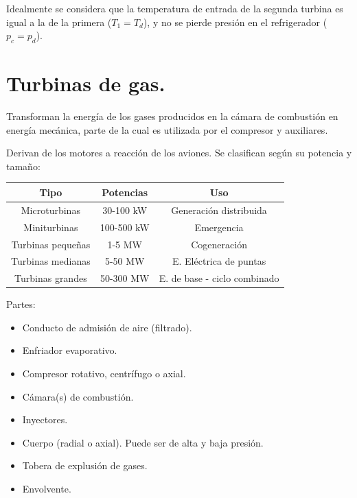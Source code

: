			
			Idealmente se considera que la temperatura de entrada de la segunda turbina es igual a la de la primera ($T_1 = T_d$), y no se pierde presión en el refrigerador ($p_c = p_d$).
			
	
	\section{Turbinas de gas.}
		Transforman la energía de los gases producidos en la cámara de combustión en energía mecánica, parte de la cual es utilizada por el compresor y auxiliares.
		
		
		Derivan de los motores a reacción de los aviones. Se clasifican según su potencia y tamaño:
		\begin{table}[H]
			\centering
			\begin{tabular}{ccc}
				Tipo & Potencias & Uso\\
				\hline
				Microturbinas		& 30-100 kW & Generación distribuida \\
				Miniturbinas		& 100-500 kW& Emergencia\\
				Turbinas pequeñas	& 1-5 MW	& Cogeneración\\
				Turbinas medianas	& 5-50 MW	& E. Eléctrica de puntas\\
				Turbinas grandes	& 50-300 MW	& E. de base - ciclo combinado
			\end{tabular}
		\end{table}
		
		Partes:
		\begin{itemize}
			\item Conducto de admisión de aire (filtrado).
			\item Enfriador evaporativo.
			\item Compresor rotativo, centrífugo o axial.
			\item Cámara(s) de combustión.
			\item Inyectores.
			\item Cuerpo (radial o axial). Puede ser de alta y baja presión.
			\item Tobera de explusión de gases.
			\item Envolvente.
		\end{itemize}
		
